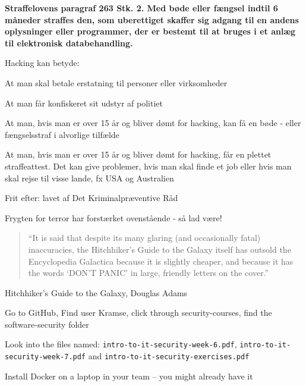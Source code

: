 \documentclass[Screen16to9,17pt]{foils}
\begin{document}

\vskip 1cm
{\bfseries Straffelovens paragraf 263 Stk. 2. Med bøde eller fængsel
  indtil 6 måneder
straffes den, som uberettiget skaffer sig adgang til en andens
oplysninger eller programmer, der er bestemt til at bruges i et anlæg
til elektronisk databehandling.}

Hacking kan betyde:
\begin{list2}
\item At man skal betale erstatning til personer eller virksomheder
\item At man får konfiskeret sit udstyr af politiet
\item At man, hvis man er over 15 år og bliver dømt for hacking, kan
  få en bøde - eller fængselsstraf i alvorlige tilfælde
\item At man, hvis man er over 15 år og bliver dømt for hacking, får
en plettet straffeattest. Det kan give problemer, hvis man skal finde
et job eller hvis man skal rejse til visse lande, fx USA og
Australien
\item Frit efter:  lavet af Det
  Kriminalpræventive Råd
\item Frygten for terror har forstærket ovenstående - så lad være!
\end{list2}




\begin{quote}
“It is said that despite its many glaring (and occasionally fatal) inaccuracies, the Hitchhiker’s Guide to the Galaxy itself has outsold the Encyclopedia Galactica because it is slightly cheaper, and because it has the words ‘DON’T PANIC’ in large, friendly letters on the cover.”
\end{quote}
Hitchhiker’s Guide to the Galaxy, Douglas Adams


\begin{list2}
\item Go to GitHub, Find user Kramse, click through security-courses, find the software-security folder\\
\item Look into the files named: \verb+intro-to-it-security-week-6.pdf+, \verb+intro-to-it-security-week-7.pdf+ and \verb+intro-to-it-security-exercises.pdf+
\item Install Docker on a laptop in your team -- you might already have it
\end{list2}
\end{document}
